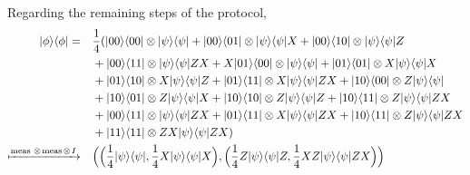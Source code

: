 Regarding the remaining steps of the protocol, 
\begin{equation} \label{eq:teleport_measure}
  \begin{split}
    |\phi\rangle \langle \phi| = \quad & \frac{1}{4} (|00\rangle \langle 00| \otimes |\psi\rangle \langle \psi| + |00\rangle  \langle 01| \otimes |\psi\rangle \langle \psi| X + |00\rangle  \langle 10| \otimes |\psi\rangle \langle \psi| Z     \\ 
    & + |00\rangle  \langle 11| \otimes |\psi\rangle \langle \psi| ZX + X|01 \rangle \langle 00| \otimes |\psi\rangle \langle \psi| + |01 \rangle \langle 01| \otimes X|\psi\rangle \langle \psi|X    \\
    & + |01 \rangle \langle 10| \otimes X|\psi\rangle \langle \psi|Z + |01 \rangle \langle 11| \otimes X|\psi\rangle \langle \psi|ZX  + |10 \rangle \langle 00| \otimes Z|\psi\rangle \langle \psi|   \\
    & + |10 \rangle \langle 01| \otimes Z|\psi\rangle \langle \psi| X + |10 \rangle \langle 10| \otimes Z|\psi\rangle \langle \psi| Z + |10 \rangle \langle 11| \otimes Z|\psi\rangle \langle \psi| ZX \\
    & + |00 \rangle \langle 11| \otimes |\psi\rangle \langle \psi| ZX + |01 \rangle \langle 11| \otimes X|\psi\rangle \langle \psi| ZX + |10 \rangle \langle 11| \otimes Z|\psi\rangle \langle \psi| ZX  \\
    & + |11 \rangle \langle 11| \otimes ZX|\psi\rangle \langle \psi| ZX) \\
    \xmapsto{ \text{meas } \otimes \hspace{1pt} \text{meas} \hspace{1pt}  \otimes \hspace{1pt} I} \quad & \Big(\Big(\frac{1}{4} |\psi\rangle \langle \psi|, \frac{1}{4} X|\psi\rangle \langle \psi|X\Big),\Big(\frac{1}{4} Z|\psi\rangle \langle \psi|Z, \frac{1}{4}  XZ|\psi\rangle \langle \psi|ZX \Big)\Big) \\
  \end{split}
\end{equation}

